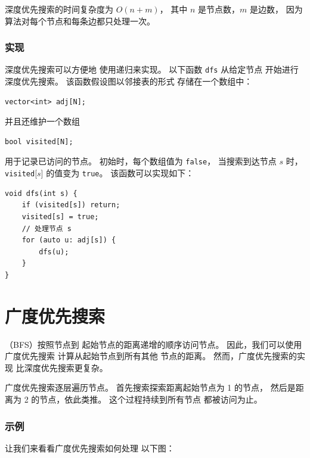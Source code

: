 深度优先搜索的时间复杂度为 $O(n+m)$，
其中 $n$ 是节点数，$m$ 是边数，
因为算法对每个节点和每条边都只处理一次。

\subsubsection*{实现}

深度优先搜索可以方便地
使用递归来实现。
以下函数 \texttt{dfs} 从给定节点
开始进行深度优先搜索。
该函数假设图以邻接表的形式
存储在一个数组中：
\begin{lstlisting}
vector<int> adj[N];
\end{lstlisting}
并且还维护一个数组
\begin{lstlisting}
bool visited[N];
\end{lstlisting}
用于记录已访问的节点。
初始时，每个数组值为 \texttt{false}，
当搜索到达节点 $s$ 时，
\texttt{visited}[$s$] 的值变为 \texttt{true}。
该函数可以实现如下：
\begin{lstlisting}
void dfs(int s) {
    if (visited[s]) return;
    visited[s] = true;
    // 处理节点 s
    for (auto u: adj[s]) {
        dfs(u);
    }
}
\end{lstlisting}

\section{广度优先搜索}


（BFS）按照节点到
起始节点的距离递增的顺序访问节点。
因此，我们可以使用广度优先搜索
计算从起始节点到所有其他
节点的距离。
然而，广度优先搜索的实现
比深度优先搜索更复杂。

广度优先搜索逐层遍历节点。
首先搜索探索距离起始节点为 1 的节点，
然后是距离为 2 的节点，依此类推。
这个过程持续到所有节点
都被访问为止。

\subsubsection*{示例}

让我们来看看广度优先搜索如何处理
以下图：

